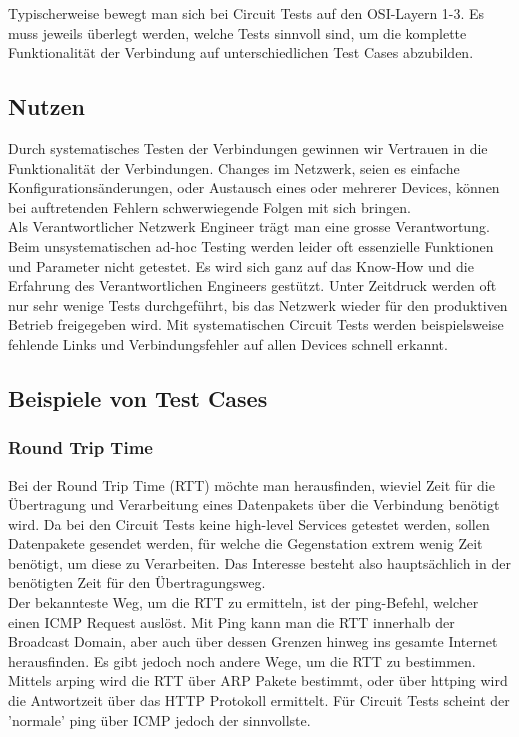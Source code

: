 \documentclass[a4,12pt]{scrartcl}
\begin{document}
\noindent Typischerweise bewegt man sich bei Circuit Tests auf den OSI-Layern 1-3. Es muss jeweils überlegt werden, welche Tests sinnvoll sind, um die komplette Funktionalität der Verbindung auf unterschiedlichen Test Cases abzubilden.   
\subsection{Nutzen}
Durch systematisches Testen der Verbindungen gewinnen wir Vertrauen in die Funktionalität der Verbindungen. Changes im Netzwerk, seien es einfache Konfigurationsänderungen, oder Austausch eines oder mehrerer Devices, können bei auftretenden Fehlern schwerwiegende Folgen mit sich bringen.\\

\noindent Als Verantwortlicher Netzwerk Engineer trägt man eine grosse Verantwortung. Beim unsystematischen ad-hoc Testing werden leider oft essenzielle Funktionen und Parameter nicht getestet. Es wird sich ganz auf das Know-How und die Erfahrung des Verantwortlichen Engineers gestützt. Unter Zeitdruck werden oft nur sehr wenige Tests durchgeführt, bis das Netzwerk wieder für den produktiven Betrieb freigegeben wird. Mit systematischen Circuit Tests werden beispielsweise fehlende Links und Verbindungsfehler auf allen Devices schnell erkannt. 
\subsection{Beispiele von Test Cases}
\subsubsection{Round Trip Time}
Bei der Round Trip Time (RTT) möchte man herausfinden, wieviel Zeit für die Übertragung und Verarbeitung eines Datenpakets über die Verbindung benötigt wird. Da bei den Circuit Tests keine high-level Services getestet werden, sollen Datenpakete gesendet werden, für welche die Gegenstation extrem wenig Zeit benötigt, um diese zu Verarbeiten. Das Interesse besteht also hauptsächlich in der benötigten Zeit für den Übertragungsweg.\\

\noindent Der bekannteste Weg, um die RTT zu ermitteln, ist der ping-Befehl, welcher einen ICMP Request auslöst. Mit Ping kann man die RTT innerhalb der Broadcast Domain, aber auch über dessen Grenzen hinweg ins gesamte Internet herausfinden. Es gibt jedoch noch andere Wege, um die RTT zu bestimmen. Mittels arping wird die RTT über ARP Pakete bestimmt, oder über httping wird die Antwortzeit über das HTTP Protokoll ermittelt. Für Circuit Tests scheint der 'normale' ping über ICMP jedoch der sinnvollste.\\
\end{document}
